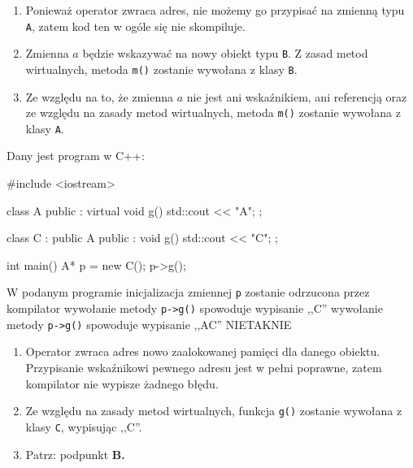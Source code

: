\begin{solutions}
\begin{enumerate}[\bf A.]
    \item Ponieważ operator  zwraca adres, nie możemy go przypisać na zmienną typu \texttt{A}, zatem kod ten w ogóle się nie skompiluje.

    \item Zmienna $a$ będzie wskazywać na nowy obiekt typu \texttt{B}. Z zasad metod wirtualnych, metoda \texttt{m()} zostanie wywołana z klasy \texttt{B}.

    \item Ze względu na to, że zmienna $a$ nie jest ani wskaźnikiem, ani referencją oraz ze względu na zasady metod wirtualnych, metoda \texttt{m()} zostanie wywołana z klasy \texttt{A}.
\end{enumerate}

\sol Dany jest program w C++:
\begin{cpp}
    #include <iostream>
    
    class A {
    public :
        virtual void g() {
            std::cout << "A";
        }
    };
    
    class C : public A {
    public :
        void g() {
            std::cout << "C";
        }
    };
    
    int main() {
        A* p = new C(); 
        p->g();
    }
\end{cpp}
W podanym programie
\answerss
{inicjalizacja zmiennej \texttt{p} zostanie odrzucona przez kompilator}
{wywołanie metody \texttt{p->g()} spowoduje wypisanie ,,C''}
{wywołanie metody \texttt{p->g()} spowoduje wypisanie ,,AC''}
{NIE}{TAK}{NIE}

\begin{enumerate}
    \item Operator  zwraca adres nowo zaalokowanej pamięci dla danego obiektu. Przypisanie wskaźnikowi pewnego adresu jest w pełni poprawne, zatem kompilator nie wypisze żadnego błędu.

    \item Ze względu na zasady metod wirtualnych, funkcja \texttt{g()} zostanie wywołana z klasy \texttt{C}, wypisując ,,C''.

    \item Patrz: podpunkt \textbf{B.}
\end{enumerate}
\end{solutions}
